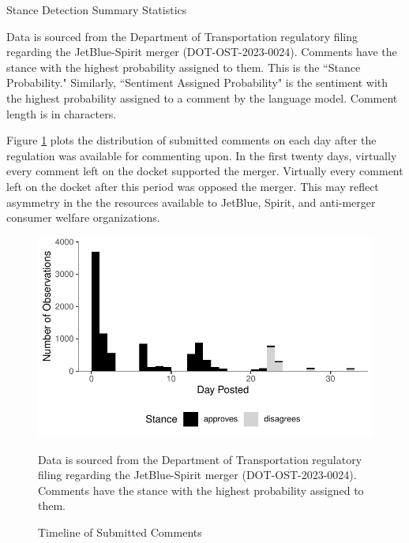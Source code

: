 \documentclass{article}
\begin{document}
\begin{appendices}
\begin{table}[h]
    \caption{Stance Detection Summary Statistics}
    \label{tab:Stance_Summary}
    
    \begin{minipage}{\textwidth} 
        {\footnotesize Data is sourced from the Department of Transportation regulatory filing regarding the JetBlue-Spirit merger  (DOT-OST-2023-0024). Comments have the stance with the highest probability assigned to them. This is the ``Stance Probability." Similarly, ``Sentiment Assigned Probability" is the sentiment with the highest  probability assigned to a comment by the language model. Comment length is in characters.} 
    \end{minipage}
\end{table}

Figure \ref{fig:CommentTimeline} plots the distribution of submitted comments on each day after the regulation was available for commenting upon. In the first twenty days, virtually every comment left on the docket supported the merger. Virtually every comment left on the docket after this period was opposed the merger. This may reflect asymmetry in the the resources available to JetBlue, Spirit, and anti-merger consumer welfare organizations.  

    \begin{figure}[h]
		\caption{Timeline of Submitted Comments}
		\label{fig:CommentTimeline}
        \begin{center}
    	\includegraphics{stance_submission_timeline}
        \end{center}
		\begin{minipage}{\textwidth} 
			{\footnotesize Data is sourced from the Department of Transportation regulatory filing regarding the JetBlue-Spirit merger  (DOT-OST-2023-0024). Comments have the stance with the highest probability assigned to them.} 
		\end{minipage}
	\end{figure}
	    


\end{appendices}
\end{document}
